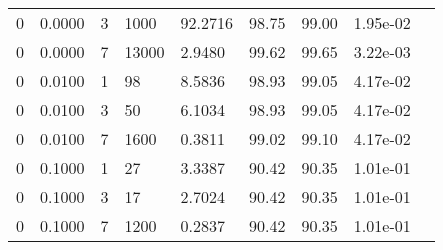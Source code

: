 \begin{longtable}{@{}lllllllll@{}}
0           & 0.0000 & 3   & 1000   & 92.2716 & 98.75   & 99.00   & 1.95e-02 &  \\
0           & 0.0000 & 7   & 13000  & 2.9480  & 99.62   & 99.65   & 3.22e-03 &  \\
0           & 0.0100 & 1   & 98     & 8.5836  & 98.93   & 99.05   & 4.17e-02 &  \\
0           & 0.0100 & 3   & 50     & 6.1034  & 98.93   & 99.05   & 4.17e-02 &  \\
0           & 0.0100 & 7   & 1600   & 0.3811  & 99.02   & 99.10   & 4.17e-02 &  \\
0           & 0.1000 & 1   & 27     & 3.3387  & 90.42   & 90.35   & 1.01e-01 &  \\
0           & 0.1000 & 3   & 17     & 2.7024  & 90.42   & 90.35   & 1.01e-01 &  \\
0           & 0.1000 & 7   & 1200   & 0.2837  & 90.42   & 90.35   & 1.01e-01 &  \\* \bottomrule
\end{longtable}
